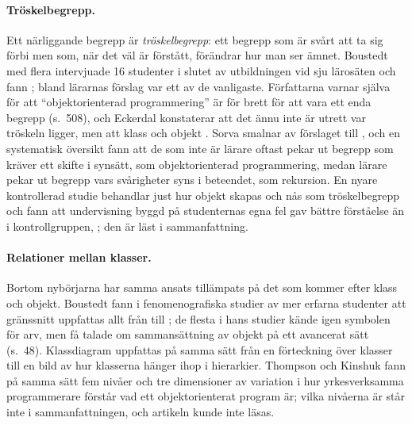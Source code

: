 \paragraph{Tröskelbegrepp.}  Ett närliggande begrepp är
\emph{tröskelbegrepp}: ett begrepp som är svårt att ta sig förbi men som,
när det väl är förstått, förändrar hur man ser ämnet.
Boustedt med flera intervjuade 16 studenter i slutet av
utbildningen vid sju lärosäten och fann ; bland lärarnas förslag var
 ett
av de vanligaste\autocite[504--505]{Boustedt2007Threshold}.  Författarna
varnar själva för att \enquote{objektorienterad programmering} är för brett för
att vara ett
enda begrepp (s.~508), och Eckerdal konstaterar att det ännu inte är
utrett var tröskeln ligger, men att klass och objekt
.  Sorva smalnar av förslaget till
, och en systematisk översikt fann att de som inte är lärare
oftast pekar ut begrepp som kräver ett skifte i synsätt, som
objektorienterad programmering, medan lärare pekar ut begrepp vars
svårigheter syns i beteendet, som rekursion\autocite{ShenEtAl2026}.  En
nyare kontrollerad studie behandlar just hur objekt skapas och nås som
tröskelbegrepp och fann att undervisning byggd på
studenternas egna fel gav bättre förståelse än i kontrollgruppen,
; den är läst i sammanfattning.

\paragraph{Relationer mellan klasser.}  Bortom nybörjarna har samma
ansats tillämpats på det som kommer efter klass och objekt.
Boustedt fann i fenomenografiska studier av mer erfarna studenter att
gränssnitt uppfattas allt från  till \autocite[46]{Boustedt2010PhD}; de flesta i hans studier kände
igen symbolen för arv, men få talade om sammansättning av objekt på ett
avancerat sätt (s.~48).  Klassdiagram uppfattas på samma sätt från en
förteckning över klasser till en bild av hur klasserna hänger ihop i
hierarkier\autocite{Boustedt2012ClassDiagrams}.  Thompson och Kinshuk
fann på samma sätt fem nivåer och tre dimensioner av variation i hur
yrkesverksamma programmerare förstår vad ett objektorienterat program
är\autocite{ThompsonKinshuk2011}; vilka nivåerna är står inte i
sammanfattningen, och artikeln kunde inte läsas.

